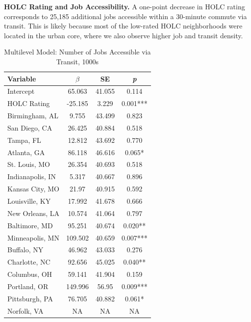 \documentclass[paper=letter, fontsize=12pt]{scrartcl} %
\begin{document}
\begin{table}
	\textbf{HOLC Rating and Job Accessibility.} A one-point decrease in HOLC rating corresponds to 25,185 additional jobs accessible within a 30-minute commute via transit. This is likely because most of the low-rated HOLC neighborhoods were located in the urban core, where we also observe higher job and transit density.
	\caption{Multilevel Model: Number of Jobs Accessible via Transit, 1000s}
	\begin{center}
		\begin{tabular}{|| l | c c c ||}
			\hline
			Variable & $\beta$ & SE & \textit{p}\\
			\hline \hline
			Intercept & 65.063 & 41.055 & 0.114\\ 
			\hline 
			HOLC Rating & -25.185 & 3.229 & 0.001***\\ 
			\hline 
			Birmingham, AL & 9.755 & 43.499 & 0.823\\ 
			\hline 
			San Diego, CA & 26.425 & 40.884 & 0.518\\ 
			\hline 
			Tampa, FL & 12.812 & 43.692 & 0.770\\ 
			\hline 
			Atlanta, GA & 86.118 & 46.616 & 0.065*\\ 
			\hline 
			St. Louis, MO & 26.354 & 40.693 & 0.518\\ 
			\hline 
			Indianapolis, IN & 5.317 & 40.667 & 0.896\\ 
			\hline 
			Kansas City, MO & 21.97 & 40.915 & 0.592\\ 
			\hline 
			Louisville, KY & 17.992 & 41.678 & 0.666\\ 
			\hline 
			New Orleans, LA & 10.574 & 41.064 & 0.797\\ 
			\hline 
			Baltimore, MD & 95.251 & 40.674 & 0.020**\\ 
			\hline 
			Minneapolis, MN & 109.502 & 40.659 & 0.007***\\ 
			\hline 
			Buffalo, NY & 46.962 & 43.033 & 0.276\\ 
			\hline 
			Charlotte, NC & 92.656 & 45.025 & 0.040**\\ 
			\hline 
			Columbus, OH & 59.141 & 41.904 & 0.159\\ 
			\hline 
			Portland, OR & 149.996 & 56.95 & 0.009***\\ 
			\hline 
			Pittsburgh, PA & 76.705 & 40.882 & 0.061*\\ 
			\hline 
			Norfolk, VA & NA & NA & NA\\ 
			\hline 
		\end{tabular}
	\end{center}

\end{table}
\end{document}
